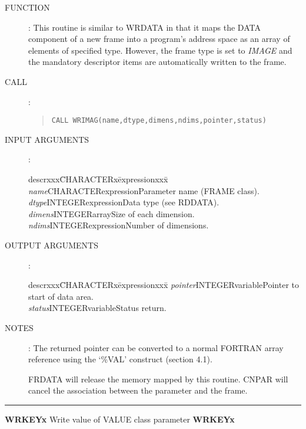 \begin{description}
\item [FUNCTION]:
This routine is similar to WRDATA in that it maps the DATA component of a new
frame into a program's address space as an array of elements of specified type.
However, the frame type is set to {\em IMAGE} and the mandatory descriptor items are
automatically written to the frame.
\item [CALL]:
\begin{quote}
{\tt CALL WRIMAG(name,dtype,dimens,ndims,pointer,status)}
\end{quote}
\item [INPUT ARGUMENTS]:
\begin{tabbing}
descrxxx\=CHARACTERx\=expressionxxx\=\kill
{\em name}\>CHARACTER\>expression\>Parameter name (FRAME class).\\
{\em dtype}\>INTEGER\>expression\>Data type (see RDDATA).\\
{\em dimens}\>INTEGER\>array\>Size of each dimension.\\
{\em ndims}\>INTEGER\>expression\>Number of dimensions.
\end{tabbing}
\item [OUTPUT ARGUMENTS]:
\begin{tabbing}
descrxxx\=CHARACTERx\=expressionxxx\=\kill
{\em pointer}\>INTEGER\>variable\>Pointer to start of data area.\\
{\em status}\>INTEGER\>variable\>Status return.
\end{tabbing}
\item [NOTES]:
The returned pointer can be converted to a normal FORTRAN array reference using
the `\%VAL' construct (section 4.1).

FRDATA will release the memory mapped by this routine.
CNPAR will cancel the association between the parameter and the frame.
\end{description}
\rule{\textwidth}{0.3mm}
{\Large {\bf WRKEYx} \hfill Write value of VALUE class parameter \hfill {\bf WRKEYx}}
